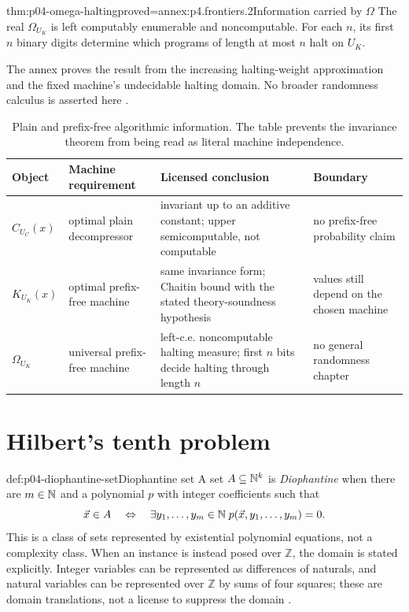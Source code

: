 \begin{hbtheorem}{thm:p04-omega-halting}{proved=annex:p4.frontiers.2}{Information carried by \(\Omega\)}
The real \(\Omega_{U_K}\) is left computably enumerable and noncomputable.
For each \(n\), its first \(n\) binary digits determine which programs of
length at most \(n\) halt on \(U_K\).
\end{hbtheorem}

The annex proves the result from the increasing halting-weight approximation
and the fixed machine's undecidable halting domain.  No broader randomness
calculus is asserted here \cite{Chaitin1975,LiVitanyi2008}.

\begin{table}[htbp]
\centering
\small
\begin{tabular}{@{}p{}p{}p{}p{}@{}}
\toprule
Object & Machine requirement & Licensed conclusion & Boundary \\
\midrule
\(C_{U_C}(x)\) & optimal plain decompressor & invariant up to an additive
constant; upper semicomputable, not computable & no prefix-free probability
claim \\
\(K_{U_K}(x)\) & optimal prefix-free machine & same invariance form; Chaitin
bound with the stated theory-soundness hypothesis & values still depend on
the chosen machine \\
\(\Omega_{U_K}\) & universal prefix-free machine & left-c.e. noncomputable
halting measure; first \(n\) bits decide halting through length \(n\) & no
general randomness chapter \\
\bottomrule
\end{tabular}
\caption{Plain and prefix-free algorithmic information.
The table prevents the invariance theorem from being read as literal machine
independence.}
\label{tab:p04-kolmogorov-boundaries}
\end{table}

\section{Hilbert's tenth problem}
\label{sec:p04-mrdp}

\begin{hbdefinition}{def:p04-diophantine-set}{Diophantine set}
A set \(A\subseteq\mathbb{N}^k\) is \emph{Diophantine} when there are
\(m\in\mathbb{N}\) and a polynomial \(p\) with integer coefficients such that
\[
 \vec x\in A\quad\Leftrightarrow\quad
 \exists y_1,\ldots,y_m\in\mathbb{N}\;
 p(\vec x,y_1,\ldots,y_m)=0.
\]
This is a class of sets represented by existential polynomial equations, not
a complexity class.  When an instance is instead posed over \(\mathbb Z\),
the domain is stated explicitly.  Integer variables can be represented as
differences of naturals, and natural variables can be represented over
\(\mathbb Z\) by sums of four squares; these are domain translations, not a
license to suppress the domain \cite{Davis1973}.
\end{hbdefinition}

